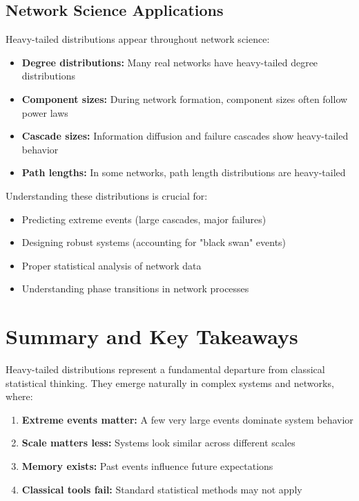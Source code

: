 \documentclass[11pt]{article}
\begin{document}
\subsection{Network Science Applications}

Heavy-tailed distributions appear throughout network science:
\begin{itemize}
\item \textbf{Degree distributions:} Many real networks have heavy-tailed degree distributions
\item \textbf{Component sizes:} During network formation, component sizes often follow power laws
\item \textbf{Cascade sizes:} Information diffusion and failure cascades show heavy-tailed behavior
\item \textbf{Path lengths:} In some networks, path length distributions are heavy-tailed
\end{itemize}

Understanding these distributions is crucial for:
\begin{itemize}
\item Predicting extreme events (large cascades, major failures)
\item Designing robust systems (accounting for "black swan" events)
\item Proper statistical analysis of network data
\item Understanding phase transitions in network processes
\end{itemize}

\section{Summary and Key Takeaways}

Heavy-tailed distributions represent a fundamental departure from classical statistical thinking. They emerge naturally in complex systems and networks, where:

\begin{enumerate}
\item \textbf{Extreme events matter:} A few very large events dominate system behavior
\item \textbf{Scale matters less:} Systems look similar across different scales
\item \textbf{Memory exists:} Past events influence future expectations
\item \textbf{Classical tools fail:} Standard statistical methods may not apply
\end{enumerate}
\end{document}
